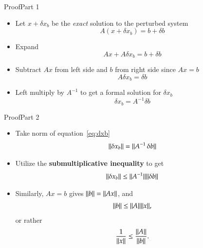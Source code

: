 \documentclass[10pt]{beamer}
\begin{document}
\begin{frame}{Proof}{Part 1}
\begin{itemize}
    \item Let $x + \delta x_b$ be the \emph{exact} solution to the perturbed system
\begin{equation}   \label{eq:axdb}
    A (x + \delta x_b) = b + \delta b
\end{equation}
    \item Expand
\begin{equation*}
    Ax + A \delta x_b = b + \delta b
\end{equation*}
    \item Subtract $Ax$ from left side and $b$ from right side since $Ax=b$
\begin{equation*}
    A \delta x_b = \delta b
\end{equation*}
\item Left multiply by $A^{-1}$ to get a formal solution for $\delta x_b$
\begin{equation}   \label{eq:dxb}
    \delta x_b = A^{-1} \delta b
\end{equation}
\end{itemize}
\end{frame}
\begin{frame}{Proof}{Part 2}
\begin{itemize}
    \item Take norm of equation~\eqref{eq:dxb}
        \begin{equation*}
            {\ensuremath{{\|\delta x_b\|}}} = {{\|A^{-1}\,\delta b\|}}
        \end{equation*}
    \item Utilize the \textbf{submultiplicative inequality} to get
        \begin{equation}  \label{eq:normdxb}
            {\ensuremath{{\|\delta x_b\|}}} \le {\ensuremath{{\|A^{-1}\|}}}{\ensuremath{{\|\delta b\|}}}
        \end{equation}
    \item Similarly, $Ax=b$ gives ${{\|b\|}} = {{\|Ax\|}}$, and
            \begin{equation}   \label{eq:normb}
                {\ensuremath{{\|b\|}}} \le {\ensuremath{{\|A\|}}}{\ensuremath{{\|x\|}}},
            \end{equation}
    or rather
        \begin{equation}     \label{eq:normxi}
            \frac{1}{{{\|x\|}}} \le \frac{{{\|A\|}}}{{{\|b\|}}}.
        \end{equation}
\end{itemize}
\end{frame}
\end{document}
